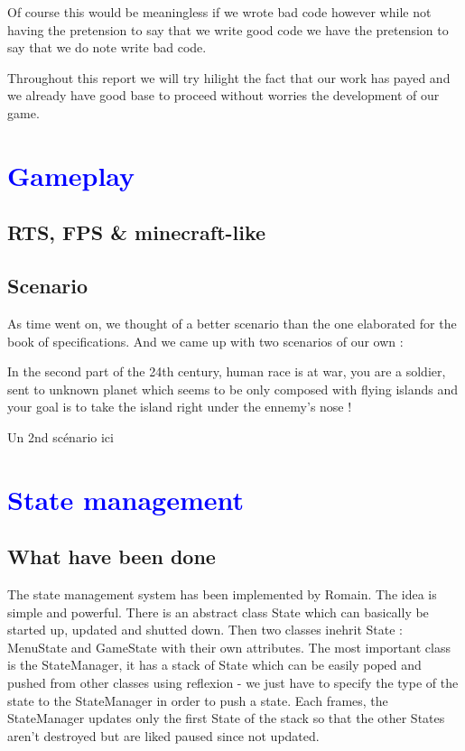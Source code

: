\documentclass[article]{report} %
\begin{document}
 			Of course this would be meaningless if we wrote bad code however while not having the pretension to say that we write good code we have the pretension to say that 
 			we do note write bad code.

 			Throughout this report we will try hilight the fact that our work has payed and we already have good base to proceed without worries the development of our game.



								
  		\chapter{\textcolor{blue}{Gameplay}}
			\section{RTS, FPS \& minecraft-like}

			\section{Scenario}
				As time went on, we thought of a better scenario than the one elaborated for the book of specifications. 
				And we came up with two scenarios of our own : 

				\begin{description}
					\item In the second part of the 24th century, human race is at war, you are a soldier, sent to unknown planet which seems to be only composed
						with flying islands and your goal is to take the island right under the ennemy's nose !
					\item Un 2nd scénario ici
				\end{description} 
				
											
  		\chapter{\textcolor{blue}{State management}}
  			\section{What have been done}
  				The state management system has been implemented by Romain. The idea is simple and powerful. There is an abstract class State which can basically be started up, updated and shutted down. Then two classes inehrit State : MenuState and GameState with their own attributes. The most important class is the StateManager, it has a stack of State which can be easily poped and pushed from other classes using reflexion - we just have to specify the type of the state to the StateManager in order to push a state. Each frames, the StateManager updates only the first State of the stack so that the other States aren't destroyed but are liked paused since not updated.\\
\end{document}
